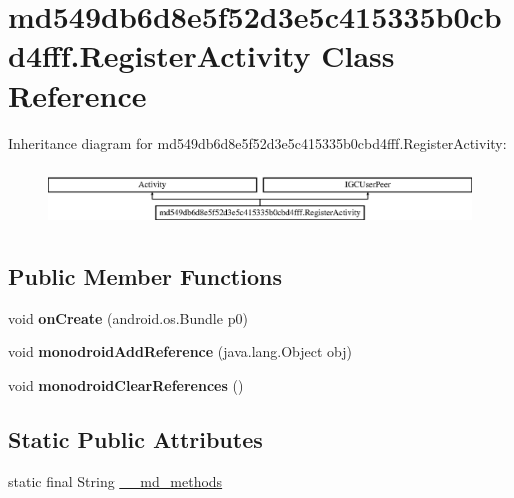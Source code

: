 \hypertarget{classmd549db6d8e5f52d3e5c415335b0cbd4fff_1_1_register_activity}{}\section{md549db6d8e5f52d3e5c415335b0cbd4fff.\+Register\+Activity Class Reference}
\label{classmd549db6d8e5f52d3e5c415335b0cbd4fff_1_1_register_activity}
Inheritance diagram for md549db6d8e5f52d3e5c415335b0cbd4fff.\+Register\+Activity\+:\begin{figure}[H]
\begin{center}
\leavevmode
\includegraphics[height=1.613833cm]{classmd549db6d8e5f52d3e5c415335b0cbd4fff_1_1_register_activity}
\end{center}
\end{figure}
\subsection*{Public Member Functions}
\begin{DoxyCompactItemize}
\item 
\mbox{\label{classmd549db6d8e5f52d3e5c415335b0cbd4fff_1_1_register_activity_ae8a35c075e7cd8c66e3d5c2c92ca0a6c}} 
void {\bfseries on\+Create} (android.\+os.\+Bundle p0)
\item 
\mbox{\label{classmd549db6d8e5f52d3e5c415335b0cbd4fff_1_1_register_activity_ab95e2804e7b8f4d872f70af337b89cfd}} 
void {\bfseries monodroid\+Add\+Reference} (java.\+lang.\+Object obj)
\item 
\mbox{\label{classmd549db6d8e5f52d3e5c415335b0cbd4fff_1_1_register_activity_a6c777a4c40c549ead9897b13c1265a85}} 
void {\bfseries monodroid\+Clear\+References} ()
\end{DoxyCompactItemize}
\subsection*{Static Public Attributes}
\begin{DoxyCompactItemize}
\item 
static final String \hyperlink{classmd549db6d8e5f52d3e5c415335b0cbd4fff_1_1_register_activity_ac5e2b15e9f97af04016623e389105627}{\+\_\+\+\_\+md\+\_\+methods}
\end{DoxyCompactItemize}


